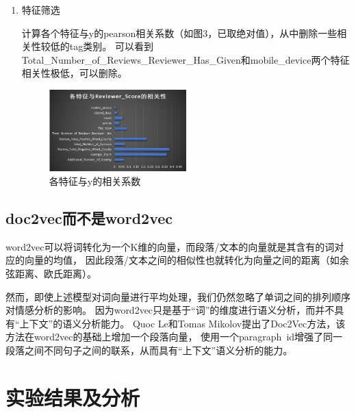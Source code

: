 \documentclass[UTF8,a4paper,12pt]{article}
\begin{document}
\begin{enumerate}[itemindent=0.5em,label=\arabic*、]
  \item 特征筛选
  \par 计算各个特征与y的pearson相关系数（如图3，已取绝对值），从中删除一些相关性较低的tag类别。
  可以看到Total\_Number\_of\_Reviews\_Reviewer\_Has\_Given和mobile\_device两个特征
  相关性极低，可以删除。
  \begin{figure}[h]
  \begin{center}
  \includegraphics[width=0.5\textwidth]{feature-pear.png}
  \caption{各特征与y的相关系数}
  \end{center}
  \end{figure}
\end{enumerate}
\subsection{doc2vec而不是word2vec}
\par word2vec可以将词转化为一个K维的向量，而段落/文本的向量就是其含有的词对应的向量的均值，
因此段落/文本之间的相似性也就转化为向量之间的距离（如余弦距离、欧氏距离）。
\par 然而，即使上述模型对词向量进行平均处理，我们仍然忽略了单词之间的排列顺序对情感分析的影响。
因为word2vec只是基于“词”的维度进行语义分析，而并不具有“上下文”的语义分析能力。
Quoc Le和Tomas Mikolov提出了Doc2Vec方法，该方法在word2vec的基础上增加一个段落向量，
使用一个paragraph\ id增强了同一段落之间不同句子之间的联系，从而具有“上下文”语义分析的能力。

\section{实验结果及分析}
\end{document}
